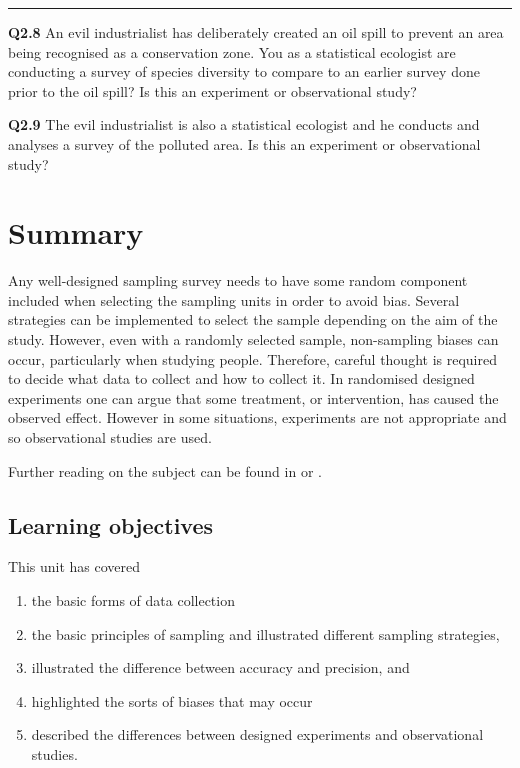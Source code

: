 \documentclass[
  oneside]{krantz}
\begin{document}
\begin{center}\rule{0.5\linewidth}{0.5pt}\end{center}

\textbf{Q2.8} An evil industrialist has deliberately created an oil spill to prevent an area being recognised as a conservation zone. You as a statistical ecologist are conducting a survey of species diversity to compare to an earlier survey done prior to the oil spill? Is this an experiment or observational study?

\textbf{Q2.9} The evil industrialist is also a statistical ecologist and he conducts and analyses a survey of the polluted area. Is this an experiment or observational study?

\hypertarget{SUMsamp}{%
\section{Summary}\label{SUMsamp}}

Any well-designed sampling survey needs to have some random component included when selecting the sampling units in order to avoid bias. Several strategies can be implemented to select the sample depending on the aim of the study. However, even with a randomly selected sample, non-sampling biases can occur, particularly when studying people. Therefore, careful thought is required to decide what data to collect and how to collect it. In randomised designed experiments one can argue that some treatment, or intervention, has caused the observed effect. However in some situations, experiments are not appropriate and so observational studies are used.

Further reading on the subject can be found in \citep{richard2006veaux} or \citep{wildgaf}.

\hypertarget{learning-objectives}{%
\subsection{Learning objectives}\label{learning-objectives}}

This unit has covered

\begin{enumerate}
\def\labelenumi{\arabic{enumi}.}
\item
  the basic forms of data collection
\item
  the basic principles of sampling and illustrated different sampling strategies,
\item
  illustrated the difference between accuracy and precision, and
\item
  highlighted the sorts of biases that may occur
\item
  described the differences between designed experiments and observational studies.
\end{enumerate}
\end{document}
